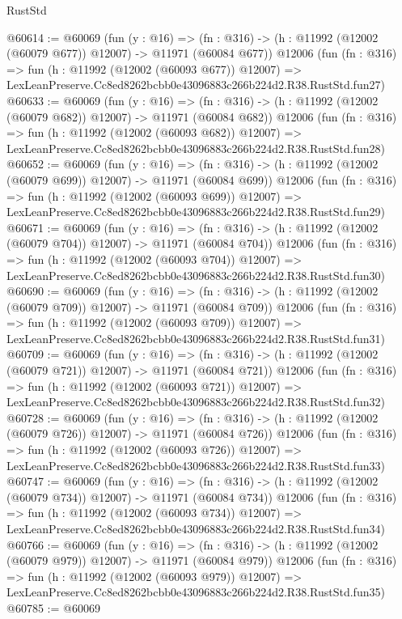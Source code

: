 \begin{lexlean}{RustStd}
\begin{coremodule}
@60614 := @60069
    (fun (y : @16) =>
    (fn : @316) -> (h : @11992 (@12002 (@60079 @677)) @12007) -> @11971 (@60084 @677))
    @12006
    (fun (fn : @316) =>
    fun (h : @11992 (@12002 (@60093 @677)) @12007) =>
    LexLeanPreserve.Cc8ed8262bcbb0e43096883c266b224d2.R38.RustStd.fun27)
@60633 := @60069
    (fun (y : @16) =>
    (fn : @316) -> (h : @11992 (@12002 (@60079 @682)) @12007) -> @11971 (@60084 @682))
    @12006
    (fun (fn : @316) =>
    fun (h : @11992 (@12002 (@60093 @682)) @12007) =>
    LexLeanPreserve.Cc8ed8262bcbb0e43096883c266b224d2.R38.RustStd.fun28)
@60652 := @60069
    (fun (y : @16) =>
    (fn : @316) -> (h : @11992 (@12002 (@60079 @699)) @12007) -> @11971 (@60084 @699))
    @12006
    (fun (fn : @316) =>
    fun (h : @11992 (@12002 (@60093 @699)) @12007) =>
    LexLeanPreserve.Cc8ed8262bcbb0e43096883c266b224d2.R38.RustStd.fun29)
@60671 := @60069
    (fun (y : @16) =>
    (fn : @316) -> (h : @11992 (@12002 (@60079 @704)) @12007) -> @11971 (@60084 @704))
    @12006
    (fun (fn : @316) =>
    fun (h : @11992 (@12002 (@60093 @704)) @12007) =>
    LexLeanPreserve.Cc8ed8262bcbb0e43096883c266b224d2.R38.RustStd.fun30)
@60690 := @60069
    (fun (y : @16) =>
    (fn : @316) -> (h : @11992 (@12002 (@60079 @709)) @12007) -> @11971 (@60084 @709))
    @12006
    (fun (fn : @316) =>
    fun (h : @11992 (@12002 (@60093 @709)) @12007) =>
    LexLeanPreserve.Cc8ed8262bcbb0e43096883c266b224d2.R38.RustStd.fun31)
@60709 := @60069
    (fun (y : @16) =>
    (fn : @316) -> (h : @11992 (@12002 (@60079 @721)) @12007) -> @11971 (@60084 @721))
    @12006
    (fun (fn : @316) =>
    fun (h : @11992 (@12002 (@60093 @721)) @12007) =>
    LexLeanPreserve.Cc8ed8262bcbb0e43096883c266b224d2.R38.RustStd.fun32)
@60728 := @60069
    (fun (y : @16) =>
    (fn : @316) -> (h : @11992 (@12002 (@60079 @726)) @12007) -> @11971 (@60084 @726))
    @12006
    (fun (fn : @316) =>
    fun (h : @11992 (@12002 (@60093 @726)) @12007) =>
    LexLeanPreserve.Cc8ed8262bcbb0e43096883c266b224d2.R38.RustStd.fun33)
@60747 := @60069
    (fun (y : @16) =>
    (fn : @316) -> (h : @11992 (@12002 (@60079 @734)) @12007) -> @11971 (@60084 @734))
    @12006
    (fun (fn : @316) =>
    fun (h : @11992 (@12002 (@60093 @734)) @12007) =>
    LexLeanPreserve.Cc8ed8262bcbb0e43096883c266b224d2.R38.RustStd.fun34)
@60766 := @60069
    (fun (y : @16) =>
    (fn : @316) -> (h : @11992 (@12002 (@60079 @979)) @12007) -> @11971 (@60084 @979))
    @12006
    (fun (fn : @316) =>
    fun (h : @11992 (@12002 (@60093 @979)) @12007) =>
    LexLeanPreserve.Cc8ed8262bcbb0e43096883c266b224d2.R38.RustStd.fun35)
@60785 := @60069

\end{coremodule}
\end{lexlean}
